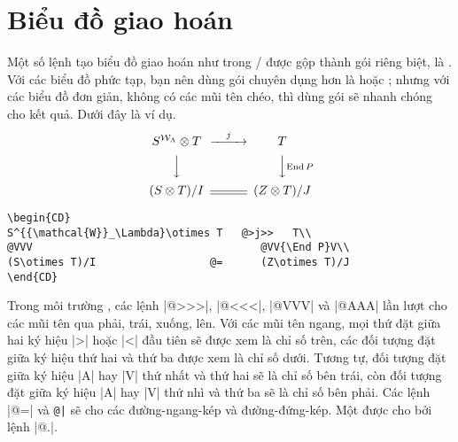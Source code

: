 \chapter{Biểu đồ giao hoán}\label{s:commdiag}

Một số lệnh tạo biểu đồ giao hoán như trong \amstex/ được gộp thành 
gói riêng biệt, là . Với các biểu đồ phức tạp, bạn nên dùng gói
chuyên dụng hơn là  hoặc ; nhưng với các biểu đồ
đơn giản, không có các mũi tên chéo, thì dùng gói  sẽ nhanh
chóng cho kết quả. Dưới đây là ví dụ.
\begin{equation*}
\begin{CD}
S^{{\mathcal{W}}_\Lambda}\otimes T   @>j>>   T\\
@VVV                                    @VV{\End P}V\\
(S\otimes T)/I                  @=      (Z\otimes T)/J
\end{CD}
\end{equation*}
\begin{verbatim}
\begin{CD}
S^{{\mathcal{W}}_\Lambda}\otimes T   @>j>>   T\\
@VVV                                    @VV{\End P}V\\
(S\otimes T)/I                  @=      (Z\otimes T)/J
\end{CD}
\end{verbatim}
Trong môi trường , các lệnh |@>>>|, |@<<<|, |@VVV| và |@AAA|
lần lượt cho các mũi tên qua phải, trái, xuống, lên. Với các mũi tên ngang,
mọi thứ đặt giữa hai ký hiệu |>| hoặc |<| đầu tiên sẽ được xem là chỉ số trên,
các đối tượng đặt giữa ký hiệu thứ hai và thứ ba được xem là chỉ số dưới.
Tương tự, đối tượng đặt giữa ký hiệu |A| hay |V| thứ nhất và thứ hai
sẽ là chỉ số bên trái, còn đối tượng đặt giữa ký hiệu |A| hay |V| thứ nhì và
thứ ba sẽ là chỉ số bên phải. Các lệnh |@=| và \verb'@|'
sẽ cho các đường-ngang-kép và đường-đứng-kép. Một 
được cho bởi lệnh |@.|.


